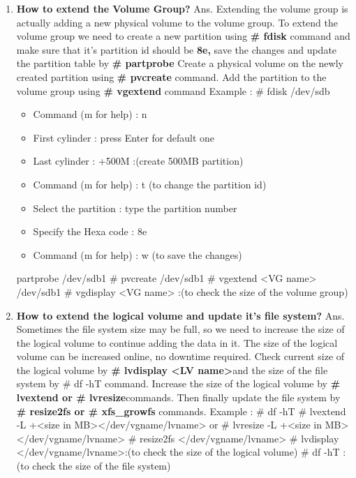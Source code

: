 \begin{enumerate}
\begin{enumerate}
    \bigskip
    \bigskip

    \item \textbf{How to extend the Volume Group?}
    \newline
    Ans. Extending the volume group is actually adding a new physical volume to the volume group.
    To extend the volume group we need to create a new partition using \textbf{# fdisk }command and make sure that it's partition id should be \textbf{8e,} save the changes and update the partition table by \textbf{# partprobe}
    \newline 
    Create a physical volume on the newly created partition using \textbf{ # pvcreate} command.
    Add the partition to the volume group using \textbf{# vgextend }command 
    Example :  # fdisk   /dev/sdb
            \begin{itemize}
              \item Command (m for help) : n
              \item First cylinder : press Enter for default one
              \item Last cylinder : +500M  :(create 500MB partition)
              \item  Command (m for help) : t   	(to change the partition id)
              \item Select the partition : type the partition number
              \item Specify the Hexa code : 8e
              \item Command (m for help) : w   	(to save the changes)
            \end{itemize}
            partprobe   /dev/sdb1
	          # pvcreate   /dev/sdb1
	          # vgextend   <VG name>   /dev/sdb1
	          # vgdisplay   <VG name>	:(to check the size of the volume group)

    \bigskip
    \bigskip
    
    \item \textbf{How to extend the logical volume and update it's file system?}
    \newline
    Ans. Sometimes the file system size may be full, so we need to increase the size of the logical volume to continue adding the data in it.
    The size of the logical volume can be increased online, no downtime required.
    Check current size of the logical volume by \textbf{# lvdisplay  <LV name>}and the size of the file system by # df -hT  command.
    Increase the size of the logical volume by \textbf{# lvextend or # lvresize}commands.
    Then finally update the file system by \textbf{# resize2fs or # xfs_growfs} commands.
    Example :   # df   -hT
			# lvextend    -L   +<size in MB></dev/vgname/lvname>    or
			# lvresize   -L   +<size in MB></dev/vgname/lvname>
			# resize2fs    </dev/vgname/lvname>
			# lvdisplay   </dev/vgname/lvname>:(to check the size of the logical volume)
			# df    -hT	:(to check the size of the file system)
    

\end{enumerate}
\end{enumerate}
